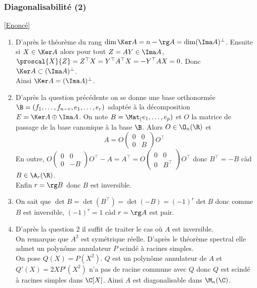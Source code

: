\documentclass[8pt]{book}
\begin{document}
	\subsubsection{Diagonalisabilité (2)}
	\label{Diagonalisabilité (2) corrigé}
	\textcolor{blue}{\hyperref[Diagonalisabilité (2)]{[Enoncé]}}\\
	\begin{enumerate}[leftmargin=*]
		\item D'après le théorème du rang $\dim\Ker A=n-\rg A=\dim(\Ima A)^\bot$. Ensuite si $X\in \Ker A$ alors pour tout $Z=AY\in \Ima A$, $\proscal{X}{Z}=Z^\top X=Y^\top A^\top X=-Y^\top AX=0$. Donc $\Ker A\subset (\Ima A)^\bot$.\\
		Ainsi $\Ker A=(\Ima A)^\bot$.
		\item D'après la question précédente on se donne une base orthonormée $\B=(f_1,\dots,f_{n-r},e_1,\dots,e_r)$ adaptée à la décomposition $E=\Ker A\oplus \Ima A$. On note $B=\Mat_(e_1,\dots,e_p)$ et $O$ la matrice de passage de la base canonique à la base $\B$. Alors $O\in \O_n(\R)$ et
		$$A=O\begin{pmatrix}
			0&0\\
			0&B
		\end{pmatrix}O^\top$$
		En outre, $O\begin{pmatrix}
			0&0\\
			0&-B
		\end{pmatrix}O^\top-A=A^\top=O\begin{pmatrix}
			0&0\\
			0&B^\top
		\end{pmatrix}O^\top$ donc $B^\top=-B$ càd $B\in \A_r(\R)$.\\
		Enfin $r=\rg B$ donc $B$ est inversible.
		\item On sait que $\det B=\det(B^\top)=\det(-B)=(-1)^r\det B$ donc comme $B$ est inversible, $(-1)^r=1$ càd $r=\rg A$ est pair.
		\item D'après la question 2 il suffit de traiter le cas où $A$ est inversible.\\
		On remarque que $A^2$ est symétrique réelle. D'après le théorème spectral elle admet un polynôme annulateur $P$ scindé à racines simples.\\
		On pose $Q(X)=P(X^2)$. $Q$ est un polynôme annulateur de $A$ et $Q'(X)=2XP'(X^2)$ n'a pas de racine commune avec $Q$ donc $Q$ est scindé à racines simples dans $\C[X]$. Ainsi $A$ est diagonalisable dans $\M_n(\C)$.
	\end{enumerate}
	
\end{document}

